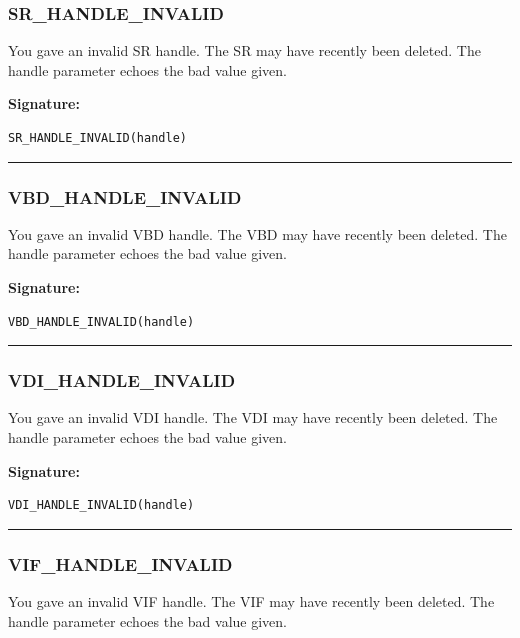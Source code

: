 \subsubsection{SR\_HANDLE\_INVALID}

You gave an invalid SR handle.  The SR may have recently been deleted.  The
handle parameter echoes the bad value given.

\vspace{0.3cm}
{\bf Signature:}
\begin{verbatim}SR_HANDLE_INVALID(handle)\end{verbatim}
\begin{center}\rule{10em}{0.1pt}\end{center}

\subsubsection{VBD\_HANDLE\_INVALID}

You gave an invalid VBD handle.  The VBD may have recently been deleted. 
The handle parameter echoes the bad value given.

\vspace{0.3cm}
{\bf Signature:}
\begin{verbatim}VBD_HANDLE_INVALID(handle)\end{verbatim}
\begin{center}\rule{10em}{0.1pt}\end{center}

\subsubsection{VDI\_HANDLE\_INVALID}

You gave an invalid VDI handle.  The VDI may have recently been deleted. 
The handle parameter echoes the bad value given.

\vspace{0.3cm}
{\bf Signature:}
\begin{verbatim}VDI_HANDLE_INVALID(handle)\end{verbatim}
\begin{center}\rule{10em}{0.1pt}\end{center}

\subsubsection{VIF\_HANDLE\_INVALID}

You gave an invalid VIF handle.  The VIF may have recently been deleted. 
The handle parameter echoes the bad value given.

